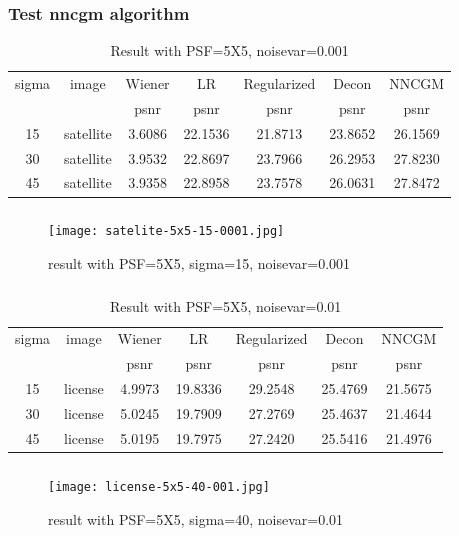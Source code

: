 \documentclass[notheorems,mathserif,table,compress,dvipsnames]{beamer}  %
\begin{document}
%
\begin{frame}
\frametitle{Test nncgm algorithm}
\begin{table}
\begin{tabular}{|c|c|c|c|c|c|c|} 
\hline
sigma&image& \multicolumn{1}{|c|}{Wiener}&LR&Regularized&Decon&NNCGM\\
\cline{3-7}
&& psnr&psnr&psnr&psnr&psnr\\
\hline
15&satellite&3.6086&22.1536&21.8713&23.8652&26.1569\\
\hline
30&satellite&3.9532&22.8697&23.7966&26.2953&27.8230\\
\hline
45&satellite&3.9358&22.8958&23.7578&26.0631&27.8472\\
\hline
\end{tabular}
\caption{Result with PSF=5X5, noisevar=0.001}
\end{table}
\end{frame}

%
\begin{frame}
\frametitle{ }
\begin{figure}[!ht]
\texttt{[image: satelite-5x5-15-0001.jpg]}
\caption{result with PSF=5X5, sigma=15, noisevar=0.001}
\end{figure}
\end{frame}

%
\begin{frame}
\frametitle{}
\begin{table}
\begin{tabular}{|c|c|c|c|c|c|c|} 
\hline
sigma&image& \multicolumn{1}{|c|}{Wiener}&LR&Regularized&Decon&NNCGM\\
\cline{3-7}
&& psnr&psnr&psnr&psnr&psnr\\
\hline
15&license&4.9973&19.8336&29.2548&25.4769&21.5675\\
\hline
30&license&5.0245&19.7909&27.2769&25.4637&21.4644\\
\hline
45&license&5.0195&19.7975&27.2420&25.5416&21.4976\\
\hline
\end{tabular}
\caption{Result with PSF=5X5, noisevar=0.01}
\end{table}
\end{frame}

%
\begin{frame}
\frametitle{ }
\begin{figure}[!ht]
\texttt{[image: license-5x5-40-001.jpg]}
\caption{result with PSF=5X5, sigma=40, noisevar=0.01}
\end{figure}
\end{frame}
\end{document}
